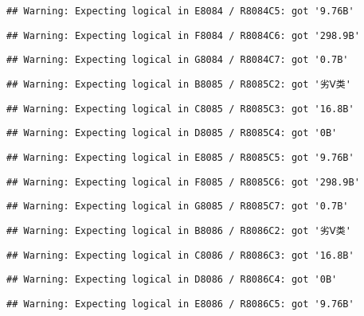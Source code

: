 \documentclass[
]{article}
\begin{document}
\begin{verbatim}
## Warning: Expecting logical in E8084 / R8084C5: got '9.76B'
\end{verbatim}

\begin{verbatim}
## Warning: Expecting logical in F8084 / R8084C6: got '298.9B'
\end{verbatim}

\begin{verbatim}
## Warning: Expecting logical in G8084 / R8084C7: got '0.7B'
\end{verbatim}

\begin{verbatim}
## Warning: Expecting logical in B8085 / R8085C2: got '劣Ⅴ类'
\end{verbatim}

\begin{verbatim}
## Warning: Expecting logical in C8085 / R8085C3: got '16.8B'
\end{verbatim}

\begin{verbatim}
## Warning: Expecting logical in D8085 / R8085C4: got '0B'
\end{verbatim}

\begin{verbatim}
## Warning: Expecting logical in E8085 / R8085C5: got '9.76B'
\end{verbatim}

\begin{verbatim}
## Warning: Expecting logical in F8085 / R8085C6: got '298.9B'
\end{verbatim}

\begin{verbatim}
## Warning: Expecting logical in G8085 / R8085C7: got '0.7B'
\end{verbatim}

\begin{verbatim}
## Warning: Expecting logical in B8086 / R8086C2: got '劣Ⅴ类'
\end{verbatim}

\begin{verbatim}
## Warning: Expecting logical in C8086 / R8086C3: got '16.8B'
\end{verbatim}

\begin{verbatim}
## Warning: Expecting logical in D8086 / R8086C4: got '0B'
\end{verbatim}

\begin{verbatim}
## Warning: Expecting logical in E8086 / R8086C5: got '9.76B'
\end{verbatim}
\end{document}
